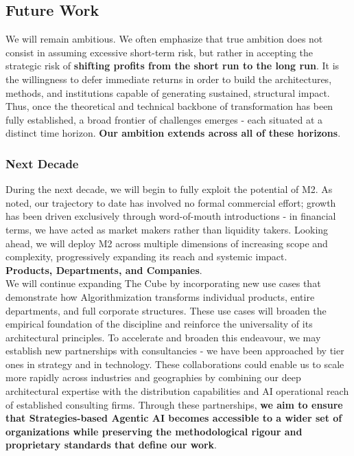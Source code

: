 \documentclass{article}
\begin{document}
\subsection{Future Work}
\label{subsection: Future Work}
We will remain ambitious. We often emphasize that true ambition does not consist in assuming excessive short-term risk, but rather in accepting the strategic risk of \textbf{shifting profits from the short run to the long run}. It is the willingness to defer immediate returns in order to build the architectures, methods, and institutions capable of generating sustained, structural impact.\\

Thus, once the theoretical and technical backbone of transformation has been fully established, a broad frontier of challenges emerges - each situated at a distinct time horizon. \textbf{Our ambition extends across all of these horizons}.\\

\subsubsection{Next Decade}
\label{subsubsection: Next Decade}
During the next decade, we will begin to fully exploit the potential of M2. As noted, our trajectory to date has involved no formal commercial effort; growth has been driven exclusively through word-of-mouth introductions - in financial terms, we have acted as market makers rather than liquidity takers. Looking ahead, we will deploy M2 across multiple dimensions of increasing scope and complexity, progressively expanding its reach and systemic impact.\\

\textbf{Products, Departments, and Companies}.\\

We will continue expanding The Cube by incorporating new use cases that demonstrate how Algorithmization transforms individual products, entire departments, and full corporate structures. These use cases will broaden the empirical foundation of the discipline and reinforce the universality of its architectural principles. To accelerate and broaden this endeavour, we may establish new partnerships with consultancies - we have been approached by tier ones in strategy and in technology. These collaborations could enable us to scale more rapidly across industries and geographies by combining our deep architectural expertise with the distribution capabilities and AI operational reach of established consulting firms. Through these partnerships, \textbf{we aim to ensure that Strategies-based Agentic AI becomes accessible to a wider set of organizations while preserving the methodological rigour and proprietary standards that define our work}.\\
\end{document}
